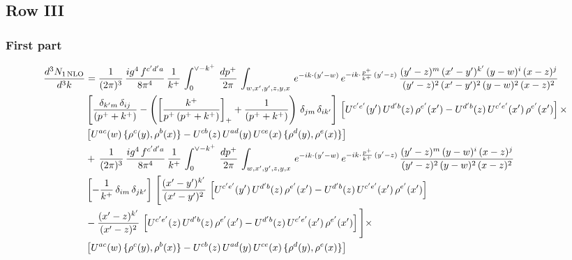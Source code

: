 \documentclass[9pt]{article}
\numberwithin{equation}{section}
\begin{document}
 \subsection{Row III}
\subsubsection{First part}
\begin{align}
     \frac{d^{3}N_{1\,\rm NLO}}{d^{3}k} & =  \frac{1}{(2\pi)^{3}}\, \frac{ig^{4}\,f^{c'd'a}}{8\pi^{4}}\, \frac{1}{k^{+}}\,\int_{0}^{\vee-k^{+}}\,  \frac{dp^{+}}{2\pi}\, \int_{w,x',y',z,y,x}\, e^{-ik\cdot (y'-w)}\, e^{-ik\cdot \frac{p^{+}}{k^{+}}\,(y'-z)}\,\frac{(y'-z)^{m}\,(x'-y')^{k'}\,(y-w)^{i}\,(x-z)^{j}}{(y'-z)^{2}\,(x'-y')^{2}\,(y-w)^{2}\,(x-z)^{2}}\notag \\ & \left[\frac{\delta_{k'm}\,\delta_{ij}}{(p^{+}+k^{+})}-\left(\left[\frac{k^{+}}{p^{+}\,(p^{+}+k^{+})}\right]_{+}+\frac{1}{(p^{+}+k^{+})}\right)\,\delta_{jm}\,\delta_{ik'}\right]\, \left[U^{c'e'}(y')\,U^{d'b}(z)\,\rho^{e'}(x')-U^{d'b}(z)\,U^{c'e'}(x')\,\rho^{e'}(x')\right]\times\notag \\ &  \left[U^{ac}(w)\, \{\rho^{c}(y),\rho^{b}(x)\}-U^{cb}(z)\,U^{ad}(y)\,U^{ce}(x)\,\{\rho^{d}(y),\rho^{e}(x)\}\right] \notag \\
&  +\,\frac{1}{(2\pi)^{3}}\, \frac{ig^{4}\,f^{c'd'a}}{8\pi^{4}}\, \frac{1}{k^{+}}\,\int_{0}^{\vee-k^{+}}\,  \frac{dp^{+}}{2\pi}\, \int_{w,x',y',z,y,x}\, e^{-ik\cdot (y'-w)}\, e^{-ik\cdot \frac{p^{+}}{k^{+}}\,(y'-z)}\,\frac{(y'-z)^{m}\,(y-w)^{i}\,(x-z)^{j}}{(y'-z)^{2}\,(y-w)^{2}\,(x-z)^{2}}\notag \\ &   \left[-\frac{1}{k^{+}}\, \delta_{im}\, \delta_{jk'}\right]\, \Bigg[\frac{(x'-y')^{k'}}{(x'-y')^{2}}\,\left[U^{c'e'}(y')\,U^{d'b}(z)\,\rho^{e'}(x')-U^{d'b}(z)\,U^{c'e'}(x')\,\rho^{e'}(x')\right]\notag \\ & -\frac{(x'-z)^{k'}}{(x'-z)^{2}}\,\left[U^{c'e'}(z)\,U^{d'b}(z)\,\rho^{e'}(x')-U^{d'b}(z)\,U^{c'e'}(x')\,\rho^{e'}(x')\right]\Bigg]\times\notag \\ &   \left[U^{ac}(w)\, \{\rho^{c}(y),\rho^{b}(x)\}-U^{cb}(z)\,U^{ad}(y)\,U^{ce}(x)\,\{\rho^{d}(y),\rho^{e}(x)\}\right]
\end{align}
\end{document}
